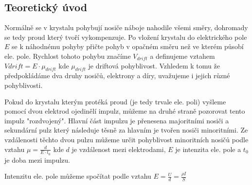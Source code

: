 \documentclass{article}
\begin{document}
\subsection*{Teoretický úvod}
Normálně se v krystalu pohybují nosiče náboje nahodile všemi směry, dohromady se tedy proud který tvoří vykompenzuje.
Po vložení krystalu do elektrického pole \(E\) se k náhodnému pohyby přičte pohyb v opačném směru než ve kterém působí ele. pole.
Rychlost tohoto pohybu značíme \(V_{drift}\) a definujeme vztahem \(V{drift} = E\cdot \mu_{drift}\) kde \(\mu_{drift}\) je driftová pohyblivost.
Vzhledem k tomu že předpokládáme dva druhy nosičů, elektrony a díry, uvažujeme i jejich různé pohyblivosti.

Pokud do krystalu kterým protéká proud (je tedy trvale ele. poli) vyšleme pomocí dvou elektrod ojedinělí impulz, můžeme na druhé straně pozorovat tento impulz "rozdvojený".
Hlavní část impulzu je přenesena majoritními nosiči a sekundární pulz který následuje těsně za hlavním je tvořen nosiči minoritními.
Ze vzdálenosti těchto dvou pulzu můžeme určit pohyblivost minoritních nosičů podle vztahu \(\mu = \frac{d}{E\cdot t_0}\) kde \(d\) je vzdálenost mezi elektrodami, \(E\) je intenzita ele. pole a \(t_0\) je doba mezi impulzu.

Intenzitu ele. pole můžeme spočítat podle vztahu \(E = \frac{U}{d} = \frac{\rho I}{S}\)
\end{document}
